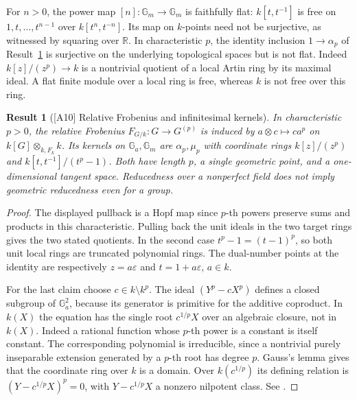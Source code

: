 \documentclass[11pt,a4paper,openany,oneside]{book}
\theoremstyle{resultstyle}
\newtheorem{statement}{Result}[chapter]
\newenvironment{result}[2]{\clubpenalty=10000\begin{statement}[\textnormal{[#1]} #2]\leavevmode\label{res:#1}\ignorespaces}{\end{statement}}
\theoremstyle{definition}
\numberwithin{equation}{chapter}
\begin{document}
For \(n>0\), the power map \([n]:\mathbb G_m\to\mathbb G_m\) is
faithfully flat: \(k[t,t^{-1}]\) is free on \(1,t,\ldots,t^{n-1}\)
over \(k[t^n,t^{-n}]\). Its map on \(k\)-points need not be surjective,
as witnessed by squaring over \(\mathbb R\). In characteristic \(p\),
the identity inclusion \(1\to\alpha_p\) of Result~\ref{res:A10} is
surjective on the underlying topological spaces but is not flat.
Indeed \(k[z]/(z^p)\to k\) is a nontrivial quotient of a local
Artin ring by its maximal ideal. A flat finite module over a local
ring is free, whereas \(k\) is not free over this ring.

\begin{result}{A10}{Relative Frobenius and infinitesimal kernels}
In characteristic \(p>0\), the relative Frobenius
\(F_{G/k}:G\to G^{(p)}\) is induced by
\(a\otimes c\mapsto c a^p\) on \(k[G]\otimes_{k,F_k}k\).
Its kernels on \(\mathbb G_a,\mathbb G_m\) are \(\alpha_p,\mu_p\)
with coordinate rings \(k[z]/(z^p)\) and \(k[t,t^{-1}]/(t^p-1)\).
Both have length \(p\), a single geometric point, and a
one-dimensional tangent space. Reducedness over a nonperfect field
does not imply geometric reducedness even for a group.
\end{result}

\begin{proof}
The displayed pullback is a Hopf map since \(p\)-th powers preserve
sums and products in this characteristic. Pulling back the unit ideals
in the two target rings gives the two stated quotients.
In the second case \(t^p-1=(t-1)^p\), so both unit local rings are
truncated polynomial rings. The dual-number points at the identity
are respectively \(z=a\varepsilon\) and \(t=1+a\varepsilon\), \(a\in k\).

For the last claim choose \(c\in k\setminus k^p\). The ideal
\((Y^p-cX^p)\) defines a closed subgroup of \(\mathbb G_a^2\), because
its generator is primitive for the additive coproduct.
In \(k(X)\) the equation has the single root \(c^{1/p}X\) over an
algebraic closure, not in \(k(X)\). Indeed a rational function whose
\(p\)-th power is a constant is itself constant. The corresponding
polynomial is irreducible, since a nontrivial purely inseparable
extension generated by a \(p\)-th root has degree \(p\).
Gauss's lemma gives that the coordinate ring over \(k\) is a domain.
Over \(k(c^{1/p})\) its defining relation is
\((Y-c^{1/p}X)^p=0\), with \(Y-c^{1/p}X\) a nonzero nilpotent class.
See \cite[Examples 1.27, 1.60, 12.28 and \S\S2.a, 2.e]{milne}.
\end{proof}
\end{document}
